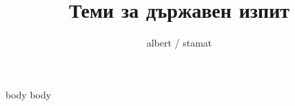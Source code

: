 \documentclass[bulgarian,a4paper,titlepage]{report}
\title{Теми за държавен изпит}
\author{albert / stamat}
\begin{document}
\maketitle
\tableofcontents

{body}
{body}
\end{document}
